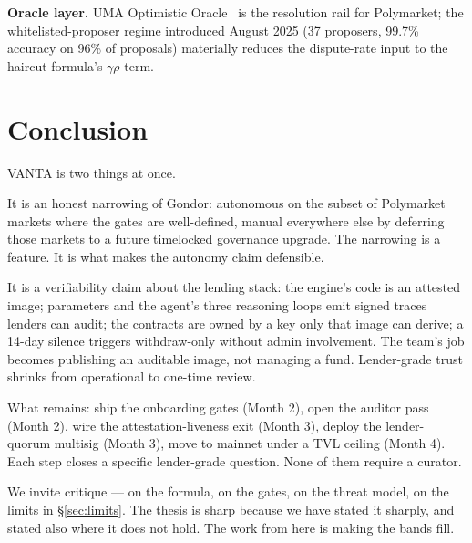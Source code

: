 \documentclass[11pt,letterpaper]{article}
\begin{document}
\textbf{Oracle layer.} UMA Optimistic Oracle~\cite{uma-disputes,uma-managed} is the resolution rail for Polymarket; the whitelisted-proposer regime introduced August 2025 (37 proposers, 99.7\% accuracy on 96\% of proposals) materially reduces the dispute-rate input to the haircut formula's $\gamma\rho$ term.

\section{Conclusion}
\label{sec:conclusion}

VANTA is two things at once.

It is an honest narrowing of Gondor: autonomous on the subset of Polymarket markets where the gates are well-defined, manual everywhere else by deferring those markets to a future timelocked governance upgrade. The narrowing is a feature. It is what makes the autonomy claim defensible.

It is a verifiability claim about the lending stack: the engine's code is an attested image; parameters and the agent's three reasoning loops emit signed traces lenders can audit; the contracts are owned by a key only that image can derive; a 14-day silence triggers withdraw-only without admin involvement. The team's job becomes publishing an auditable image, not managing a fund. Lender-grade trust shrinks from operational to one-time review.

What remains: ship the onboarding gates (Month 2), open the auditor pass (Month 2), wire the attestation-liveness exit (Month 3), deploy the lender-quorum multisig (Month 3), move to mainnet under a TVL ceiling (Month 4). Each step closes a specific lender-grade question. None of them require a curator.

We invite critique --- on the formula, on the gates, on the threat model, on the limits in \S\ref{sec:limits}. The thesis is sharp because we have stated it sharply, and stated also where it does not hold. The work from here is making the bands fill.
\end{document}
